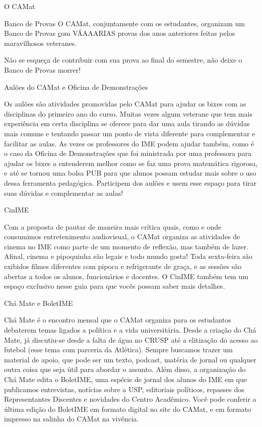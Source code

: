 \begin{secao}{O CAMat}
\begin{subsecao}{Banco de Provas}
O CAMat, conjuntamente com os estudantes, organizam um Banco de Provas
\href{https://camat.ime.usp.br/apoio/} com VÁAAARIAS provas dos anos 
anteriores feitas pelos maravilhosos veteranes.

Não se esqueça de contribuir com sua prova ao final do semestre, não
deixe o Banco de Provas morrer! 

\end{subsecao}

\begin{subsecao}{Aulões do CAMat e Oficina de Demonstrações}

Os aulões são atividades promovidas pelo CAMat para ajudar os bixes com as
disciplinas do primeiro ano do curso. Muitas vezes algum veterane que tem mais
experiência em certa disciplina se oferece para dar uma aula tirando as dúvidas
mais comuns e tentando passar um ponto de vista diferente para complementar e facilitar
as aulas. As vezes os professores do IME podem ajudar também, como é o caso da Oficina 
de Demonstrações que foi ministrada por uma professora para ajudar os bixes a entenderem 
melhor como se faz uma prova matemática rigorosa, e até se tornou uma bolsa PUB para que alunos
possam estudar mais sobre o uso dessa ferramenta pedagógica. 
Participem dos aulões e usem esse espaço para tirar suas dúvidas e complementar as aulas!

\end{subsecao}

\begin{subsecao}{CinIME}

Com a proposta de pautar de maneira mais crítica quais, como e onde consumimos 
entretenimento audiovisual, o CAMat organiza as atividades de cinema no IME 
como parte de um momento de reflexão, mas também de lazer. Afinal, cinema e 
pipoquinha são legais e todo mundo gosta! Toda sexta-feira são exibidos filmes 
diferentes com pipoca e refrigerante de graça, e as sessões são abertas a todos 
os alunos, funcionários e docentes. O CinIME também tem um espaço exclusivo nesse
guia para que vocês possam saber mais detalhes.

\end{subsecao}

\begin{subsecao}{Chá Mate e BoletIME}

Chá Mate é o encontro mensal que o CAMat organiza para os estudantos debaterem temas
ligados a política e a vida universitária. Desde a criação do Chá Mate, já discutiu-se
desde a falta de água no CRUSP até a elitização do acesso ao futebol (esse tema com parceria
da Atlética). Sempre buscamos trazer um material de apoio, que pode ser um texto, podcast, matéria
de jornal ou qualquer outra coisa que seja útil para abordar o assunto. 
Além disso, a organização do Chá Mate edita o BoletIME, uma espécie de jornal dos alunos do IME em
que publicamos entrevistas, notícias sobre a USP, editoriais políticos, repasses dos Representantes
Discentes e novidades do Centro Acadêmico. Você pode conferir a última edição do BoletIME em formato 
digital no site do CAMat, e em formato impresso na salinha do CAMat na vivência.


\end{subsecao}
\end{secao}
